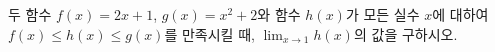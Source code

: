 두 함수 $f(x)=2x+1$, $g(x)=x^2+2$와 함수 $h(x)$가 모든 실수 $x$에 대하여 $f(x)\le h(x)\le g(x)$를 만족시킬 때, $\displaystyle\lim_{x\to 1}h(x)$의 값을 구하시오.
